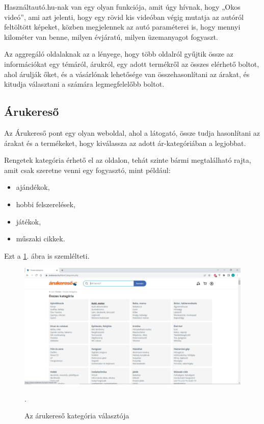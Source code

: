 Használtautó.hu-nak van egy olyan funkciója, amit úgy hívnak, hogy „Okos videó”, ami azt jelenti, hogy egy rövid kis videóban végig mutatja az autóról feltöltött képeket, közben megjelennek az autó paraméterei is, hogy mennyi kilométer van benne, milyen évjáratú, milyen üzemanyagot fogyaszt. 


Az aggregáló oldalaknak az a lényege, hogy több oldalról gyűjtik össze az információkat egy témáról, árukról, egy adott termékről az összes elérhető boltot, ahol árulják őket, és a vásárlónak lehetősége van összehasonlítani az árakat, és kitudja választani a számára legmegfelelőbb boltot.

\subsection{Árukereső}

Az Árukereső pont egy olyan weboldal, ahol a látogató, össze tudja hasonlítani az árakat és a termékeket, hogy kiválassza az adott ár-kategóriában a legjobbat.

Rengetek kategória érhető el az oldalon, tehát szinte bármi megtalálható rajta, amit csak szeretne venni egy fogyasztó, mint például:

\begin{itemize}
\item ajándékok,
\item hobbi felszerelések,
\item játékok,
\item műszaki cikkek.
\end{itemize}

Ezt a \ref{fig:arukereso}. ábra is szemlélteti.

\begin{figure}[h]
\centering
\includegraphics[scale=0.8]{images/arukereso.png}
\caption{Az árukereső kategória választója \cite{Arukereso}}.
\label{fig:arukereso}
\end{figure}
\newpage